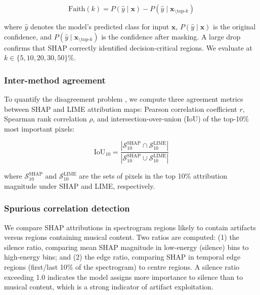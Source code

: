 \documentclass{article}
\begin{document}
\begin{equation}\label{eq:faithfulness}
\text{Faith}(k) = P(\hat{y} \mid \mathbf{x}) - P(\hat{y} \mid \mathbf{x}_{\setminus \text{top-}k})
\end{equation}

\noindent where $\hat{y}$ denotes the model's predicted class for input $\mathbf{x}$, $P(\hat{y} \mid \mathbf{x})$ is the original confidence, and $P(\hat{y} \mid \mathbf{x}_{\setminus \text{top-}k})$ is the confidence after masking. A large drop confirms that SHAP correctly identified decision-critical regions. We evaluate at $k \in \{5, 10, 20, 30, 50\}\%$.

\subsubsection{Inter-method agreement}

To quantify the disagreement problem \cite{Krishna2022}, we compute three agreement metrics between SHAP and LIME attribution maps: Pearson correlation coefficient $r$, Spearman rank correlation $\rho$, and intersection-over-union (IoU) of the top-10\% most important pixels:

\begin{equation}\label{eq:iou}
\text{IoU}_{10} = \frac{|\mathcal{S}_{10}^{\text{SHAP}} \cap \mathcal{S}_{10}^{\text{LIME}}|}{|\mathcal{S}_{10}^{\text{SHAP}} \cup \mathcal{S}_{10}^{\text{LIME}}|}
\end{equation}

\noindent where $\mathcal{S}_{10}^{\text{SHAP}}$ and $\mathcal{S}_{10}^{\text{LIME}}$ are the sets of pixels in the top 10\% attribution magnitude under SHAP and LIME, respectively.

\subsubsection{Spurious correlation detection}

We compare SHAP attributions in spectrogram regions likely to contain artifacts versus regions containing musical content. Two ratios are computed: (1) the silence ratio, comparing mean SHAP magnitude in low-energy (silence) bins to high-energy bins; and (2) the edge ratio, comparing SHAP in temporal edge regions (first/last 10\% of the spectrogram) to centre regions. A silence ratio exceeding 1.0 indicates the model assigns more importance to silence than to musical content, which is a strong indicator of artifact exploitation.
\end{document}
